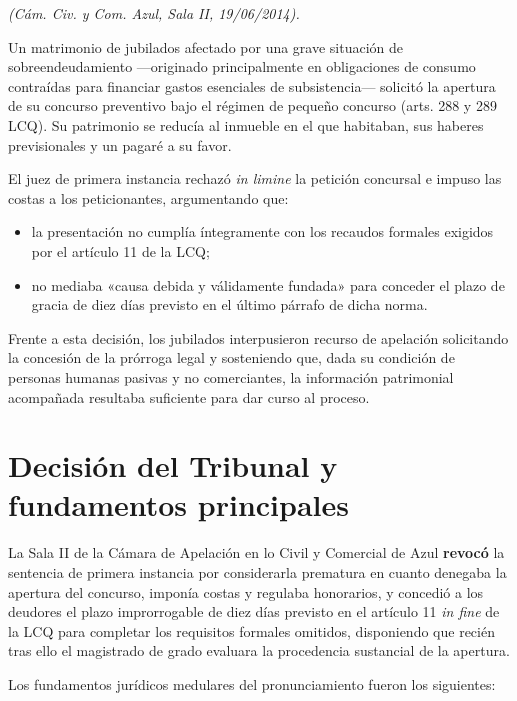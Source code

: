 \documentclass[12pt,oneside]{book}
\begin{document}
\textit{(Cám. Civ. y Com. Azul, Sala II, 19/06/2014).}

Un matrimonio de jubilados afectado por una grave situación de sobreendeudamiento ---originado principalmente en obligaciones de consumo contraídas para financiar gastos esenciales de subsistencia--- solicitó la apertura de su concurso preventivo bajo el régimen de pequeño concurso (arts. 288 y 289 LCQ). Su patrimonio se reducía al inmueble en el que habitaban, sus haberes previsionales y un pagaré a su favor.

El juez de primera instancia rechazó \textit{in limine} la petición concursal e impuso las costas a los peticionantes, argumentando que:

\begin{itemize}
    \item la presentación no cumplía íntegramente con los recaudos formales exigidos por el artículo 11 de la LCQ;
    \item no mediaba «causa debida y válidamente fundada» para conceder el plazo de gracia de diez días previsto en el último párrafo de dicha norma.
\end{itemize}

Frente a esta decisión, los jubilados interpusieron recurso de apelación solicitando la concesión de la prórroga legal y sosteniendo que, dada su condición de personas humanas pasivas y no comerciantes, la información patrimonial acompañada resultaba suficiente para dar curso al proceso.

\section{Decisión del Tribunal y fundamentos principales}

La Sala II de la Cámara de Apelación en lo Civil y Comercial de Azul \textbf{revocó} la sentencia de primera instancia por considerarla prematura en cuanto denegaba la apertura del concurso, imponía costas y regulaba honorarios, y concedió a los deudores el plazo improrrogable de diez días previsto en el artículo 11 \textit{in fine} de la LCQ para completar los requisitos formales omitidos, disponiendo que recién tras ello el magistrado de grado evaluara la procedencia sustancial de la apertura.

Los fundamentos jurídicos medulares del pronunciamiento fueron los siguientes:
\end{document}
